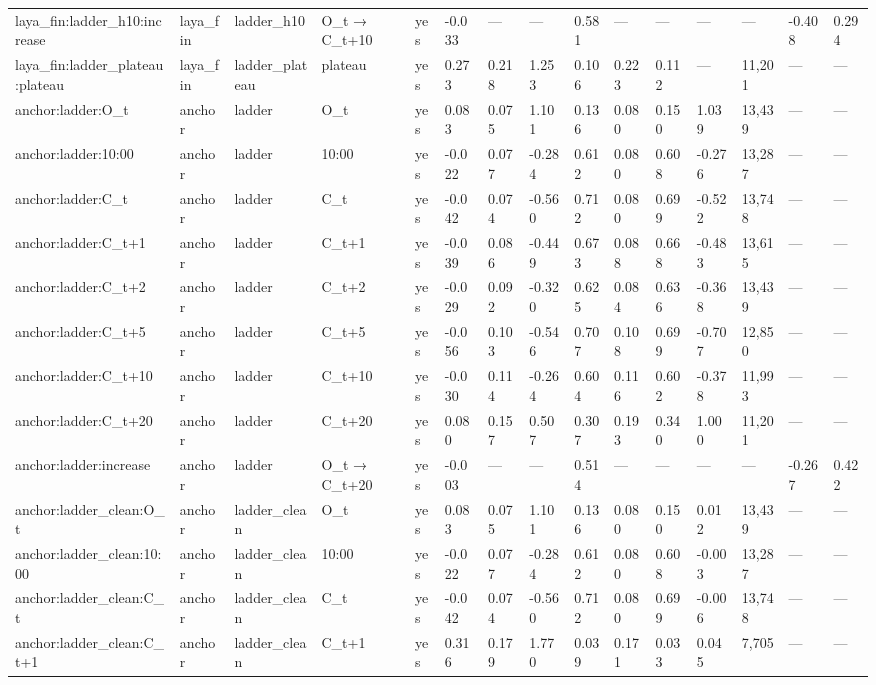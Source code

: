 \begin{tabular}{lllllllllllllll}
laya\_fin:ladder\_h10:increase & laya\_fin & ladder\_h10 & O\_t → C\_t+10 & yes & -0.033 & — & — & 0.581 & — & — & — & — & -0.408 & 0.294 \\
laya\_fin:ladder\_plateau:plateau & laya\_fin & ladder\_plateau & plateau & yes & 0.273 & 0.218 & 1.253 & 0.106 & 0.223 & 0.112 & — & 11,201 & — & — \\
anchor:ladder:O\_t & anchor & ladder & O\_t & yes & 0.083 & 0.075 & 1.101 & 0.136 & 0.080 & 0.150 & 1.039 & 13,439 & — & — \\
anchor:ladder:10:00 & anchor & ladder & 10:00 & yes & -0.022 & 0.077 & -0.284 & 0.612 & 0.080 & 0.608 & -0.276 & 13,287 & — & — \\
anchor:ladder:C\_t & anchor & ladder & C\_t & yes & -0.042 & 0.074 & -0.560 & 0.712 & 0.080 & 0.699 & -0.522 & 13,748 & — & — \\
anchor:ladder:C\_t+1 & anchor & ladder & C\_t+1 & yes & -0.039 & 0.086 & -0.449 & 0.673 & 0.088 & 0.668 & -0.483 & 13,615 & — & — \\
anchor:ladder:C\_t+2 & anchor & ladder & C\_t+2 & yes & -0.029 & 0.092 & -0.320 & 0.625 & 0.084 & 0.636 & -0.368 & 13,439 & — & — \\
anchor:ladder:C\_t+5 & anchor & ladder & C\_t+5 & yes & -0.056 & 0.103 & -0.546 & 0.707 & 0.108 & 0.699 & -0.707 & 12,850 & — & — \\
anchor:ladder:C\_t+10 & anchor & ladder & C\_t+10 & yes & -0.030 & 0.114 & -0.264 & 0.604 & 0.116 & 0.602 & -0.378 & 11,993 & — & — \\
anchor:ladder:C\_t+20 & anchor & ladder & C\_t+20 & yes & 0.080 & 0.157 & 0.507 & 0.307 & 0.193 & 0.340 & 1.000 & 11,201 & — & — \\
anchor:ladder:increase & anchor & ladder & O\_t → C\_t+20 & yes & -0.003 & — & — & 0.514 & — & — & — & — & -0.267 & 0.422 \\
anchor:ladder\_clean:O\_t & anchor & ladder\_clean & O\_t & yes & 0.083 & 0.075 & 1.101 & 0.136 & 0.080 & 0.150 & 0.012 & 13,439 & — & — \\
anchor:ladder\_clean:10:00 & anchor & ladder\_clean & 10:00 & yes & -0.022 & 0.077 & -0.284 & 0.612 & 0.080 & 0.608 & -0.003 & 13,287 & — & — \\
anchor:ladder\_clean:C\_t & anchor & ladder\_clean & C\_t & yes & -0.042 & 0.074 & -0.560 & 0.712 & 0.080 & 0.699 & -0.006 & 13,748 & — & — \\
anchor:ladder\_clean:C\_t+1 & anchor & ladder\_clean & C\_t+1 & yes & 0.316 & 0.179 & 1.770 & 0.039 & 0.171 & 0.033 & 0.045 & 7,705 & — & — \\

\end{tabular}
